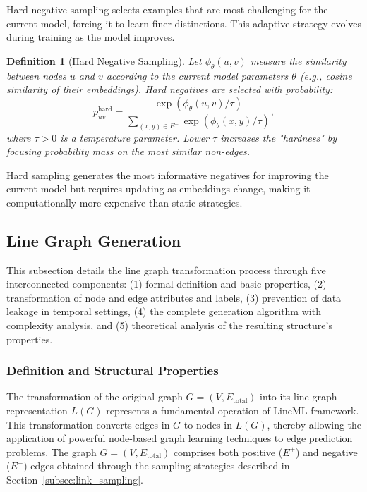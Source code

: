 \documentclass[pdflatex,sn-mathphys-num]{sn-jnl}%
\theoremstyle{thmstyleone}%
\theoremstyle{thmstyletwo}%
\theoremstyle{thmstylethree}%
\newtheorem{definition}{Definition}%
\theoremstyle{plain} %
\theoremstyle{definition} %
\theoremstyle{remark} %
\theoremstyle{plain} %
\begin{document}
Hard negative sampling selects examples that are most challenging for the current model, forcing it to learn finer distinctions. This adaptive strategy evolves during training as the model improves.

\begin{definition}[Hard Negative Sampling]
Let $\phi_\theta(u,v)$ measure the similarity between nodes $u$ and $v$ according to the current model parameters $\theta$ (e.g., cosine similarity of their embeddings). Hard negatives are selected with probability:
\begin{equation}
p_{uv}^{\text{hard}} = \frac{\exp(\phi_\theta(u,v)/\tau)}{\sum_{(x,y) \in E^-} \exp(\phi_\theta(x,y)/\tau)},
\end{equation}
where $\tau > 0$ is a temperature parameter. Lower $\tau$ increases the "hardness" by focusing probability mass on the most similar non-edges.
\end{definition}



Hard sampling generates the most informative negatives for improving the current model but requires updating as embeddings change, making it computationally more expensive than static strategies.

\subsection{Line Graph Generation}
\label{subsec:line_graph_generation}

This subsection details the line graph transformation process through five interconnected components: 
(1) formal definition and basic properties, 
(2) transformation of node and edge attributes and labels, 
(3) prevention of data leakage in temporal settings, 
(4) the complete generation algorithm with complexity analysis, and 
(5) theoretical analysis of the resulting structure's properties.

\subsubsection{Definition and Structural Properties}

The transformation of the original graph $G = (V, E_{\text{total}})$ into its line graph representation $L(G)$ represents a fundamental operation of LineML framework.
This transformation converts edges in $G$ to nodes in $L(G)$, thereby allowing the application of powerful node-based graph learning techniques to edge prediction problems. 
The graph $G = (V, E_{\text{total}})$ comprises both positive ($E^+$) and negative ($E^-$) edges obtained through the sampling strategies described in Section~\ref{subsec:link_sampling}.
\end{document}
